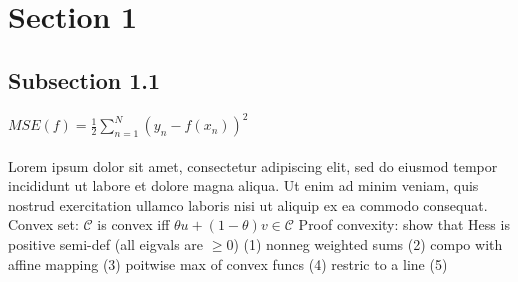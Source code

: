 \section*{Section 1}
\subsection*{Subsection 1.1}
$MSE(f) = \frac{1}{2} \sum^{N}_{n= 1}(y_{n} - f(x_{n}))^{2}$ \\
\\
Lorem ipsum dolor sit amet, consectetur adipiscing elit, sed do eiusmod tempor incididunt ut labore et dolore magna aliqua. Ut enim ad minim veniam, quis nostrud exercitation ullamco laboris nisi ut aliquip ex ea commodo consequat. \\
Convex set: $\mathcal{C}$ is convex iff $\theta u + (1 - \theta) v \in \mathcal{C}$
Proof convexity: show that Hess is positive semi-def (all eigvals are $\ge 0$)
(1) nonneg weighted sums (2) compo with affine mapping (3) poitwise max of convex funcs (4) restric to a line (5)


